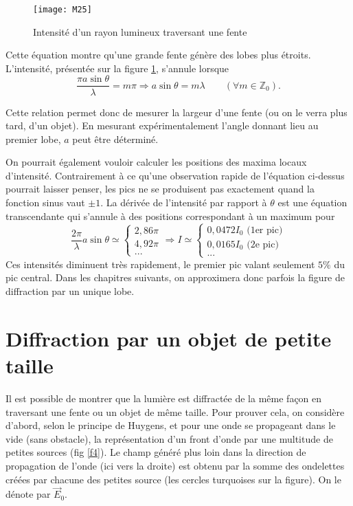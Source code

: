 \begin{figure}[h]
\texttt{[image: M25]}
\caption{Intensité d'un rayon lumineux traversant une fente}
\label{f3}
\end{figure}

\noindent Cette équation montre qu'une grande fente génère des lobes plus étroits. L'intensité, présentée sur la figure \ref{f3}, s'annule lorsque
$$
  \frac{\pi a \sin\theta}{\lambda}=m\pi \Rightarrow a \sin\theta = m\lambda \qquad(\forall m\in  \mathbb{Z}_0).
$$

\noindent Cette relation permet donc de mesurer la largeur d'une fente (ou on le verra plus tard, d'un objet). En mesurant expérimentalement l'angle donnant lieu au premier lobe, $a$ peut être déterminé.

\noindent On pourrait également vouloir calculer les positions des maxima locaux d'intensité. Contrairement à ce qu'une observation rapide de l'équation ci-dessus pourrait laisser penser, les pics ne se produisent pas exactement quand la fonction sinus vaut $\pm1$. La dérivée de l'intensité par rapport à $\theta$ est une équation transcendante qui s'annule à des positions correspondant à un maximum pour 
\[
\frac{2\pi}{\lambda}a \sin\theta\simeq
\left\{
\begin{array}{c}
 2,86\pi\\
 4,92\pi\\
...
\end{array}
\right.
\Longrightarrow
I\simeq
\left\{
\begin{array}{c}
 0,0472I_0 \mbox{ (1er pic)}\\
 0,0165I_0 \mbox{ (2e pic)}\\   
  ...
\end{array}
\right.
\]
Ces intensités diminuent très rapidement, le premier pic valant seulement $5\%$ du pic central. Dans les chapitres suivants, on approximera donc parfois la figure de diffraction par un unique lobe.

\section{Diffraction par un objet de petite taille}

Il est possible de montrer que la lumière est diffractée de la même façon en traversant une fente ou un objet de même taille. Pour prouver cela, on considère d'abord, selon le principe de Huygens, et pour une onde se propageant dans le vide (sans obstacle), la représentation d'un front d'onde par une multitude de petites sources (fig \ref{f4}). Le champ généré plus loin dans la direction de propagation de l'onde (ici vers la droite) est obtenu par la somme des ondelettes créées par chacune des petites source (les cercles turquoises sur la figure). On le dénote par $\overset\rightarrow{E}_0$.

